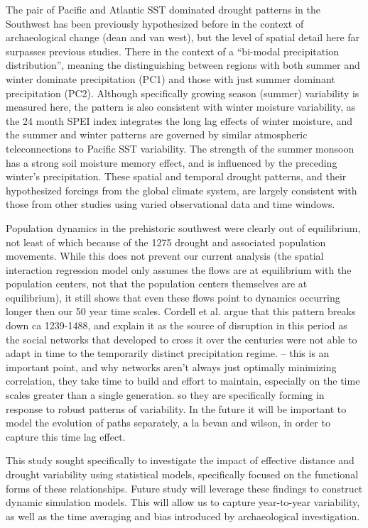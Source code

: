 \documentclass[10pt]{iopart}
\begin{document}
The pair of Pacific and Atlantic SST dominated drought patterns in the Southwest has been previously hypothesized before in the context of archaeological change (dean and van west), but the level of spatial detail here far surpasses previous studies. There in the context of a ``bi-modal precipitation distribution'', meaning the distinguishing between regions with both summer and winter dominate precipitation (PC1) and those with just summer dominant precipitation (PC2). Although specifically growing season (summer) variability is measured here, the pattern is also consistent with winter moisture variability, as the 24 month SPEI index integrates the long lag effects of winter moisture, and the summer and winter patterns are governed by similar atmospheric teleconnections to Pacific SST variability. The strength of the summer monsoon has a strong soil moisture memory effect, and is influenced by the preceding winter's precipitation. These spatial and temporal drought patterns, and their hypothesized forcings from the global climate system, are largely consistent with those from other studies using varied observational data and time windows\parencite{Comrie1999,Cook1999,McCabe1999,McCabe2004,Herrmann2016DivergentElevations,Ryu2010,Seager2014}. 

Population dynamics in the prehistoric southwest were clearly out of equilibrium, not least of which because of the 1275 drought and associated population movements. While this does not prevent our current analysis (the spatial interaction regression model only assumes the flows are at equilibrium with the population centers, not that the population centers themselves are at equilibrium), it still shows that even these flows point to dynamics occurring longer then our 50 year time scales. Cordell et al. argue that this pattern breaks down ca 1239-1488, and explain it as the source of disruption in this period as the social networks that developed to cross it over the centuries were not able to adapt in time to the temporarily distinct precipitation regime. -- this is an important point, and why networks aren't always just optimally minimizing correlation, they take time to build and effort to maintain, especially on the time scales greater than a single generation. so they are specifically forming in response to robust patterns of variability. In the future it will be important to model the evolution of paths separately, a la bevan and wilson, in order to capture this time lag effect.


This study sought specifically to investigate the impact of effective distance and drought variability using statistical models, specifically focused on the functional forms of these relationships. Future study will leverage these findings to construct dynamic simulation models. This will allow us to capture year-to-year variability, as well as the time averaging and bias introduced by archaeological investigation.
\end{document}

